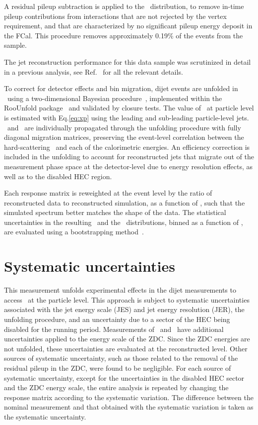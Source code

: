 \documentclass[PAPER, atlasdraft=false, USenglish, cernpreprint]{atlasdoc}
\begin{document}
A residual pileup subtraction is applied to the \EZDC\ distribution, to remove in-time pileup contributions from interactions that are not rejected by the vertex requirement, and that are characterized by no significant pileup energy deposit in the FCal. This procedure removes approximately 0.19\% of the events from the sample. 





The jet reconstruction performance for this data sample was scrutinized in detail in a previous analysis, see Ref.~\cite{ATLAS:2023zfx} for all the relevant details.





To correct for detector effects and bin migration, dijet events are unfolded in \xp\ using a two-dimensional Bayesian procedure~\cite{DAgostini:1994fjx}, implemented within the RooUnfold package~\cite{Adye:2011gm} and validated by closure tests. 
The value of \xp\ at particle level is estimated with Eq.\ref{eq:xp} using the leading and sub-leading particle-level jets.
\ETPB\ and \EZDC\ are individually propagated through the unfolding procedure with fully diagonal migration matrices, preserving the event-level correlation between the hard-scattering \kin\ and each of the calorimetric energies. 
An efficiency correction is included in the unfolding to account for reconstructed jets that migrate out of the measurement phase space at the detector-level due to energy resolution effects, as well as to the disabled HEC region. 


Each response matrix is reweighted at the event level by the ratio of reconstructed data to reconstructed simulation, as a function of \xp, such that the simulated spectrum better matches the shape of the data.
The statistical uncertainties in the resulting \ETPB\ and the \EZDC\ distributions, binned as a function of \xp, are evaluated using a bootstrapping method~\cite{ATL-PHYS-PUB-2021-011}. 

 \section{Systematic uncertainties}
This measurement unfolds experimental effects in the dijet measurements to access \xp\ at the particle level. 
This approach is subject to systematic uncertainties associated with the jet energy scale (JES) and jet energy resolution (JER), the unfolding procedure, and an uncertainty due to a sector of the HEC being disabled for the running period. 
Measurements of \EZDC\ and \AZDC\ have additional uncertainties applied to the energy scale of the ZDC\@.  
Since the ZDC energies are not unfolded, these uncertainties are evaluated at the reconstructed level. Other sources of systematic uncertainty, such as those related to the removal of the residual pileup in the ZDC, were found to be negligible. For each source of systematic uncertainty, except for the uncertainties in the disabled HEC sector and the ZDC energy scale, the entire analysis is repeated by changing the response matrix according to the systematic variation. 
The difference between the nominal measurement and that obtained with the systematic variation is taken as the systematic uncertainty.
\end{document}
